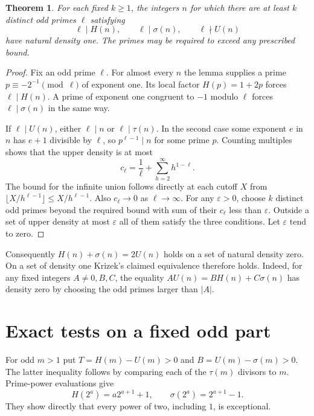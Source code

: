 \documentclass[11pt]{article}
\newtheorem{theorem}{Theorem}
\begin{document}
\begin{theorem}
For each fixed $k\ge1$, the integers $n$ for which there are at least
$k$ distinct odd primes $\ell$ satisfying
\[
 \ell\mid H(n),\qquad \ell\mid\sigma(n),\qquad \ell\nmid U(n)
\]
have natural density one. The primes may be required to exceed any
prescribed bound.
\end{theorem}
\begin{proof}
Fix an odd prime $\ell$. For almost every $n$ the lemma supplies a
prime $p\equiv-2^{-1}\pmod\ell$ of exponent one. Its local factor
$H(p)=1+2p$ forces $\ell\mid H(n)$. A prime of exponent one
congruent to $-1$ modulo $\ell$ forces $\ell\mid\sigma(n)$ in
the same way.

If $\ell\mid U(n)$, either $\ell\mid n$ or $\ell\mid\tau(n)$.
In the second case some exponent $e$ in $n$ has $e+1$ divisible
by $\ell$, so $p^{\ell-1}\mid n$ for some prime $p$. Counting
multiples shows that the upper density is at most
\[
 c_\ell=\frac1\ell+\sum_{h=2}^{\infty}h^{1-\ell}.
\]
The bound for the infinite union follows directly at each cutoff $X$
from $\lfloor X/h^{\ell-1}\rfloor\le X/h^{\ell-1}$. Also
$c_\ell\to0$ as $\ell\to\infty$. For any $\varepsilon>0$, choose
$k$ distinct odd primes beyond the required bound with sum of their
$c_\ell$ less than $\varepsilon$. Outside a set of upper density
at most $\varepsilon$ all of them satisfy the three conditions.
Let $\varepsilon$ tend to zero.
\end{proof}

Consequently $H(n)+\sigma(n)=2U(n)$ holds on a set of natural density
zero. On a set of density one Krizek's claimed equivalence therefore
holds. Indeed, for any fixed integers $A\ne0,B,C$, the equality
$AU(n)=BH(n)+C\sigma(n)$ has density zero by choosing the odd primes
larger than $|A|$.

\section{Exact tests on a fixed odd part}
For odd $m>1$ put $T=H(m)-U(m)>0$ and $B=U(m)-\sigma(m)>0$.
The latter inequality follows by comparing each of the $\tau(m)$
divisors to $m$. Prime-power evaluations give
\[
 H(2^a)=a2^{a+1}+1,\qquad \sigma(2^a)=2^{a+1}-1.
\]
They show directly that every power of two, including $1$, is
exceptional.
\end{document}
